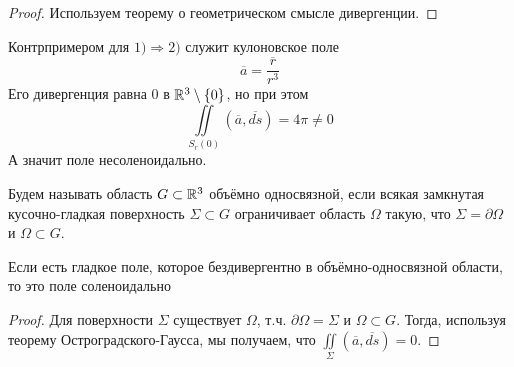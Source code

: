 \begin{proof}
    Используем теорему о геометрическом смысле дивергенции.
\end{proof}
\begin{example}
    Контрпримером для $1) \Rightarrow 2)$ служит кулоновское поле \[\overline{a} = \dfrac{\overline{r}}{r^3}\]
    Его дивергенция равна 0 в $\mathbb{R}^3 \setminus \{0\}$, но при этом \[\iint\limits_{S_r(0)} (\overline{a}, \overline{ds}) = 4\pi \neq 0\]
    А значит поле несоленоидально.
\end{example}
\begin{definition}
    Будем называть область $G \subset \mathbb{R}^3$ объёмно односвязной, если всякая замкнутая кусочно-гладкая поверхность $\Sigma \subset G$ ограничивает область $\Omega$ такую, что $\Sigma = \partial \Omega$ и $\Omega \subset G$.
\end{definition}
\begin{lemma}
    Если есть гладкое поле, которое бездивергентно в объёмно-односвязной области, то это поле соленоидально
\end{lemma}
\begin{proof}
    Для поверхности $\Sigma$ существует $\Omega$, т.ч. $\partial \Omega = \Sigma$ и $\Omega \subset G$. Тогда, используя теорему Остроградского-Гаусса, мы получаем, что $\iint\limits_\Sigma (\overline{a}, \overline{ds}) = 0$.
\end{proof}